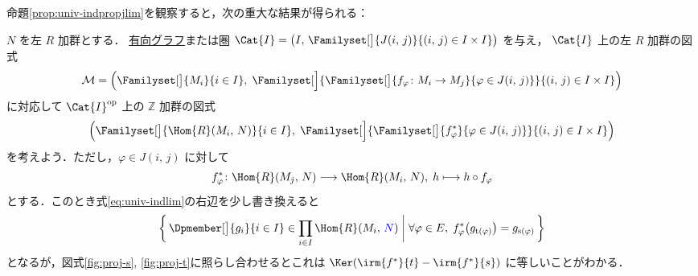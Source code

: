 \documentclass[algtopo_main]{subfiles}
\begin{document}


命題\ref{prop:univ-indpropjlim}を観察すると，次の重大な結果が得られる：

$N$ を左 $R$ 加群とする．
\hyperref[def:DG]{有向グラフ}または圏 $\Cat{I} = \bigl( I,\, \Familyset[\big]{J(i,\, j)}{(i,\, j) \in I\times I} \bigr)$ を与え，
$\Cat{I}$ 上の左 $R$ 加群の図式
\begin{align}
	\mathcal{M} = \Bigl( \Familyset[\big]{M_i}{i \in I},\; \Familyset[\Big]{\Familyset[\big]{f_\varphi \colon M_i \to M_j}{\varphi \in J(i,\, j)}}{(i,\, j) \in I \times I} \Bigr)
\end{align}
に対応して $\Cat{I}^{\mathrm{op}}$ 上の $\mathbb{Z}$ 加群の図式
\begin{align}
	\Bigl( \Familyset[\big]{\Hom{R}(M_i,\, N)}{i \in I},\; \Familyset[\Big]{\Familyset[\big]{f^*_\varphi}{\varphi \in J(i,\, j)}}{(i,\, j) \in I \times I} \Bigr)
\end{align}
を考えよう．ただし，$\varphi \in J(i,\, j)$ に対して
\begin{align}
	f_\varphi^* \colon \Hom{R}(M_j,\, N) \lto \Hom{R}(M_i,\, N),\; h \lmto h \circ f_\varphi
\end{align}
とする．このとき式\eqref{eq:univ-indlim}の右辺を少し書き換えると
\begin{align}
	\biggl\{\, \Dpmember[\big]{g_i}{i \in I} \in \prod_{i \in I} \Hom{R}(M_i,\, \textcolor{blue}{N}) \biggm| \forall \varphi \in E,\; f_\varphi^* \bigl( g_{\mathrm{t}(\varphi)} \bigr) = g_{\mathrm{s}(\varphi)} \,\biggr\}
\end{align}
となるが，図式\ref{fig:proj-s}, \ref{fig:proj-t}に照らし合わせるとこれは $\Ker (\irm{f^*}{t} - \irm{f^*}{s})$ に等しいことがわかる．
\end{document}
